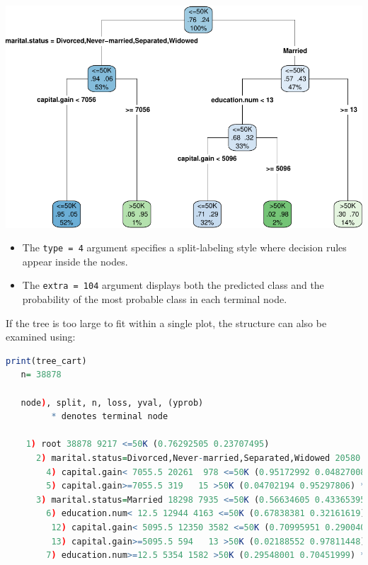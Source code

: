 \documentclass[
]{book}
\newcommand{\passthrough}[1]{#1}
\providecommand{\tightlist}{%
  \setlength{\itemsep}{0pt}\setlength{\parskip}{0pt}}
\theoremstyle{definition}
\theoremstyle{definition}
\theoremstyle{definition}
\theoremstyle{definition}
\theoremstyle{remark}
\begin{document}
\begin{center}\includegraphics[width=1\linewidth]{tree_files/figure-latex/unnamed-chunk-12-1} \end{center}

\begin{itemize}
\tightlist
\item
  The \passthrough{\lstinline!type = 4!} argument specifies a split-labeling style where decision rules appear inside the nodes.
\item
  The \passthrough{\lstinline!extra = 104!} argument displays both the predicted class and the probability of the most probable class in each terminal node.
\end{itemize}

If the tree is too large to fit within a single plot, the structure can also be examined using:

\begin{lstlisting}[language=R]
print(tree_cart)
   n= 38878 
   
   node), split, n, loss, yval, (yprob)
         * denotes terminal node
   
    1) root 38878 9217 <=50K (0.76292505 0.23707495)  
      2) marital.status=Divorced,Never-married,Separated,Widowed 20580 1282 <=50K (0.93770651 0.06229349)  
        4) capital.gain< 7055.5 20261  978 <=50K (0.95172992 0.04827008) *
        5) capital.gain>=7055.5 319   15 >50K (0.04702194 0.95297806) *
      3) marital.status=Married 18298 7935 <=50K (0.56634605 0.43365395)  
        6) education.num< 12.5 12944 4163 <=50K (0.67838381 0.32161619)  
         12) capital.gain< 5095.5 12350 3582 <=50K (0.70995951 0.29004049) *
         13) capital.gain>=5095.5 594   13 >50K (0.02188552 0.97811448) *
        7) education.num>=12.5 5354 1582 >50K (0.29548001 0.70451999) *
\end{lstlisting}
\end{document}
